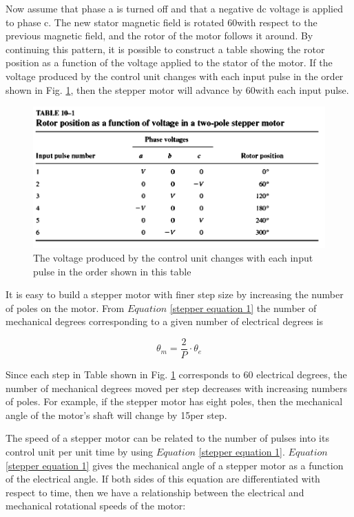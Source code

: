 \documentclass[journal]{IEEEtran}
\begin{document}
Now assume that phase a is turned off and that a negative dc voltage is applied to phase c. The new stator magnetic field is rotated 60\textdegree with respect to the previous magnetic field, and the rotor of the motor follows it around. By continuing this pattern, it is possible to construct a table showing the rotor position as a function of the voltage applied to the stator of the motor. If the voltage produced by the control unit changes with each input pulse in the order shown in Fig. \ref{fig:Table 10-1}, then the stepper motor will advance by 60\textdegree with each input pulse. 

\begin{figure}[h]
    \centering
    \includegraphics[scale=0.33]{Stepper/table 10-1.PNG}
    \caption{The voltage produced by the control unit changes with each input pulse in the order shown in this table}
    \label{fig:Table 10-1}
\end{figure}

It is easy to build a stepper motor with finer step size by increasing the number of poles on the motor. From $Equation$ \ref{stepper equation 1} the number of mechanical degrees corresponding to a given number of electrical degrees is


\begin{equation}
    \theta_m = \frac{2}{P} \cdot \theta_e
    \label{stepper equation 1}
\end{equation}


Since each step in Table shown in Fig. \ref{fig:Table 10-1} corresponds to 60 electrical degrees, the number of mechanical degrees moved per step decreases with increasing numbers of poles. For example, if the stepper motor has eight poles, then the mechanical angle of the motor's shaft will change by 15\textdegree per step.

The speed of a stepper motor can be related to the number of pulses into its control unit per unit time by using $Equation$ \ref{stepper equation 1}. $Equation$ \ref{stepper equation 1} gives the mechanical angle of a stepper motor as a function of the electrical angle. If both sides of this equation are differentiated with respect to time, then we have a relationship between the electrical and mechanical rotational speeds of the motor: 
\end{document}
